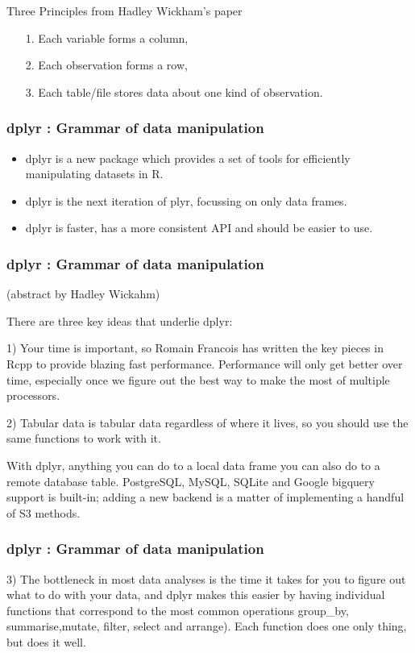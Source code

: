 \documentclass{beamer}
\begin{document}
\begin{frame}

Three Principles from Hadley Wickham's paper
\begin{itemize}
	\item[1.] Each variable forms a column, 
	\item[2.] Each observation forms a row, 
	\item[3.] Each table/file stores data about one kind of observation.
\end{itemize}
\end{frame}



\begin{frame}
\frametitle{dplyr : Grammar of data manipulation}
	\begin{itemize}
\item dplyr is a new package which provides a set of tools for efficiently manipulating datasets in R.
\item dplyr is the next iteration of plyr, focussing on only data frames. \item dplyr is faster, has a more consistent API and should be easier to use. 
	\end{itemize}


\end{frame}
\begin{frame}
\frametitle{dplyr : Grammar of data manipulation}
(abstract by Hadley Wickahm)

There are three key ideas that underlie dplyr:

1) Your time is important, so Romain Francois has written the key pieces in Rcpp to provide blazing fast performance. Performance will only get better over time, especially once we figure out the best way to make the most of multiple processors. 

\end{frame}
\begin{frame}
2) Tabular data is tabular data regardless of where it lives, so you should use the same functions to work with it. 

With dplyr, anything you can do to a local data frame you can also do to a remote database table. PostgreSQL, MySQL, SQLite and Google bigquery support is built-in; adding a new backend is a matter of implementing a handful of S3 methods. 
\end{frame}
\begin{frame}
\frametitle{dplyr : Grammar of data manipulation}
3) The bottleneck in most data analyses is the time it takes for you to figure out what to do with your data, and dplyr makes this easier by having individual functions that correspond to the most common operations  group\_by, summarise,mutate, filter, select and arrange). Each function does one only thing, but does it well.

\end{frame}	
	
\end{document}
